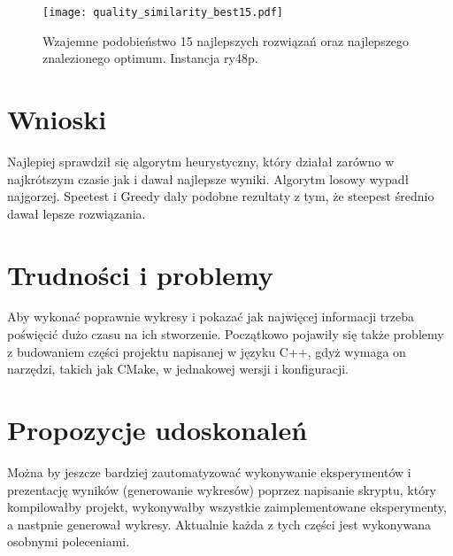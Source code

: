 \documentclass{article}
\begin{document}
\begin{figure}[H]
    \begin{center}
        \texttt{[image: quality\_similarity\_best15.pdf]}
    \end{center}
    \caption{Wzajemne podobieństwo 15 najlepszych rozwiązań oraz najlepszego znalezionego optimum. Instancja ry48p.}
    \label{fig:quality_sim}
\end{figure}

\section{Wnioski}

Najlepiej sprawdził się algorytm heurystyczny, który działał zarówno w najkrótszym czasie jak i dawał najlepsze wyniki. Algorytm losowy wypadł najgorzej. Speetest i Greedy dały podobne rezultaty z tym, że steepest średnio dawał lepsze rozwiązania.

\section{Trudności i problemy}

Aby wykonać poprawnie wykresy i pokazać jak najwięcej informacji trzeba poświęcić dużo czasu na ich stworzenie. Początkowo pojawiły się także problemy z budowaniem części projektu napisanej w języku C++, gdyż wymaga on narzędzi, takich jak CMake, w jednakowej wersji i konfiguracji.

\section{Propozycje udoskonaleń}

Można by jeszcze bardziej zautomatyzować wykonywanie eksperymentów i prezentację wyników (generowanie wykresów) poprzez napisanie skryptu, który kompilowałby projekt, wykonywałby wszystkie zaimplementowane eksperymenty, a nastpnie generował wykresy. Aktualnie każda z tych części jest wykonywana osobnymi poleceniami.

\clearpage

\printbibliography
\end{document}
